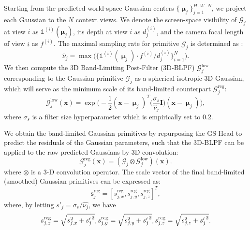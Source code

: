 \documentclass[runningheads]{llncs}
\begin{document}
Starting from the predicted world-space Gaussian centers $\{\bm{\upmu}_j\}_{j=1}^{H\cdot W\cdot N}$, we project each Gaussian to the $N$ context views. We denote the screen-space visibility of $\mathcal{G}_j$ at view $i$ as $\mathds{1}^{(i)}(\mathbf{\mu}_j)$, its depth at view $i$ as $d_j^{(i)}$, and the camera focal length of view $i$ as $f^{(i)}$. The maximal sampling rate for primitive $\mathcal{G}_j$ is determined as \cite{yu2024mip}:
\begin{equation}
    \hat{\nu}_j = \max\big(\{\mathds{1}^{(i)}(\bm{\upmu}_j) \cdot f^{(i)} / d_j^{(i)}\}_{i=1}^N\big).
    \label{eq:maximal-sampling-rate}
\end{equation}
We then compute the 3D Band-Limiting Post-Filter (3D-BLPF) $\mathcal{G}_j^\text{low}$ corresponding to the Gaussian primitive $\mathcal{G}_j$ as a spherical isotropic 3D Gaussian, which will serve as the minimum scale of its band-limited counterpart $\mathcal{G}_j^\text{reg}$:
\begin{equation}
    \mathcal{G}_{j}^\text{low}(\mathbf{x})=\exp{\bigg(-\frac{1}{2}(\mathbf{x}-\bm{\upmu}_j)^T\Big(\frac{\sigma_s}{\hat{\nu}_j}\mathbf{I}\Big)(\mathbf{x}-\bm{\upmu}_j)\bigg)},
    \label{eq:gaussian-lpf}
\end{equation}
where $\sigma_s$ is a filter size hyperparameter which is empirically set to $0.2$.

We obtain the band-limited Gaussian primitives by repurposing the GS Head to predict the residuals of the Gaussian parameters, such that the 3D-BLPF can be applied to the raw predicted Gaussians by 3D convolution:
\begin{equation}
    \mathcal{G}_{j}^\text{reg}(\mathbf{x})=(\mathcal{G}_{j}\otimes\mathcal{G}_{j}^\text{low})(\mathbf{x}).
    \label{eq:3d-conv}
\end{equation}
where $\otimes$ is a 3-D convolution operator.
The scale vector of the final band-limited (smoothed) Gaussian primitives can be expressed as:
\begin{equation}
    \mathbf{s}_{j}^\text{reg}=[s_{j,x}^\text{reg},s_{j,y}^\text{reg},s_{j,z}^\text{reg}]^T,
    \label{eq:filtering-simplified}
\end{equation} 
where, by letting  $s'_j=\sigma_s/\hat{\nu_j}$, we have
\begin{equation}
    s_{j,x}^\text{reg}=\sqrt{s_{j,x}^2+{s'_j}^2}, \\
    s_{j,y}^\text{reg}=\sqrt{s_{j,y}^2+{s'_j}^2},
    s_{j,z}^\text{reg}=\sqrt{s_{j,z}^2+{s'_j}^2}.
    \label{eq:filtering-simplified-2}
\end{equation} \\
\end{document}
